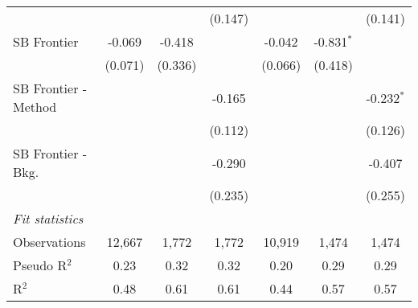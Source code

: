 \begin{tabular}{lcccccc}
                        &             &              & (0.147)     &              &              & (0.141)\\   
   SB Frontier          & -0.069      & -0.418       &             & -0.042       & -0.831$^{*}$ &   \\   
                        & (0.071)     & (0.336)      &             & (0.066)      & (0.418)      &   \\   
   SB Frontier - Method &             &              & -0.165      &              &              & -0.232$^{*}$\\   
                        &             &              & (0.112)     &              &              & (0.126)\\   
   SB Frontier - Bkg.   &             &              & -0.290      &              &              & -0.407\\   
                        &             &              & (0.235)     &              &              & (0.255)\\   
   \midrule
   \emph{Fit statistics}\\
   Observations         & 12,667      & 1,772        & 1,772       & 10,919       & 1,474        & 1,474\\  
   Pseudo R$^2$         & 0.23        & 0.32         & 0.32        & 0.20         & 0.29         & 0.29\\  
   R$^2$                & 0.48        & 0.61         & 0.61        & 0.44         & 0.57         & 0.57\\  
   

\end{tabular}
